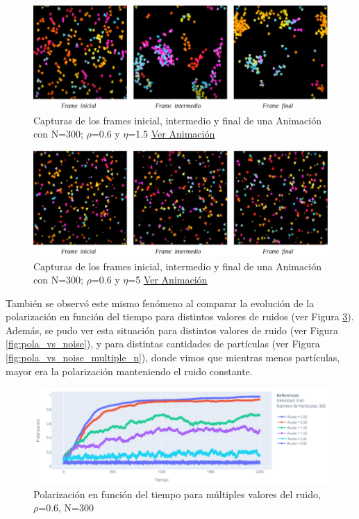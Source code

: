 \documentclass[12pt, a4paper]{report}
\begin{document}
\begin{figure}[h]
\includegraphics[scale=0.4]{noise_N300_d06_n1_5.png}
\centering 
\caption{Capturas de los frames inicial, intermedio y final de una Animación con N=300; $\rho$=0.6 y $\eta$=1.5 \href{https://www.youtube.com/watch?v=pNaZWqdfaxg}{\underline{Ver Animación}}} 
\label{fig:noise_N300_d06_n1_5}
\end{figure}

\pagebreak
\begin{figure}[h]
\includegraphics[scale=0.4]{noise_N300_d06_n5.png}
\centering 
\caption{Capturas de los frames inicial, intermedio y final de una Animación con N=300; $\rho$=0.6 y $\eta$=5 \href{https://www.youtube.com/watch?v=KpLdzP7WLP8}{\underline{Ver Animación}}}
\label{fig:noise_N300_d06_n5}
\end{figure}

También se observó este mismo fenómeno al comparar la evolución de la polarización en función del tiempo para distintos valores de ruidos (ver Figura \ref{fig:noise_pola_vs_time_multiple_n}). \\

Además, se pudo ver esta situación para distintos valores de ruido (ver Figura \ref{fig:pola_vs_noise}), y para distintas cantidades de partículas (ver Figura \ref{fig:pola_vs_noise_multiple_n}), donde vimos que mientras menos partículas, mayor era la polarización manteniendo el ruido constante.

\pagebreak
\begin{figure}[h]
\includegraphics[scale=0.45]{noise_pola_vs_time_multiple_n.png}
\centering 
\caption{Polarización en función del tiempo para múltiples valores del ruido, $\rho$=0.6, N=300 }
\label{fig:noise_pola_vs_time_multiple_n}
\end{figure}
\end{document}
